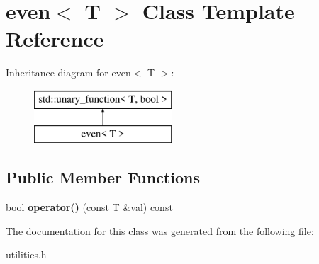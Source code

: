 \hypertarget{classeven}{\section{even$<$ T $>$ Class Template Reference}
\label{classeven}
}
Inheritance diagram for even$<$ T $>$\+:\begin{figure}[H]
\begin{center}
\leavevmode
\includegraphics[height=2.000000cm]{classeven}
\end{center}
\end{figure}
\subsection*{Public Member Functions}
\begin{DoxyCompactItemize}
\item 
\hypertarget{classeven_a08c10e28d676fb0d25ca1fc214fcf73b}{bool {\bfseries operator()} (const T \&val) const }\label{classeven_a08c10e28d676fb0d25ca1fc214fcf73b}

\end{DoxyCompactItemize}


The documentation for this class was generated from the following file\+:\begin{DoxyCompactItemize}
\item 
utilities.\+h\end{DoxyCompactItemize}
